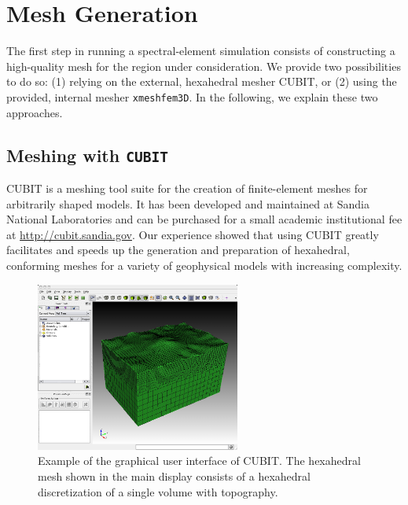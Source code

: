 \chapter{Mesh Generation}\label{cha:Mesh-Generation}

The first step in running a spectral-element simulation consists of
constructing a high-quality mesh for the region under consideration.
We provide two possibilities to do so: (1) relying on the external,
hexahedral mesher CUBIT, or (2) using the provided, internal mesher
\texttt{xmeshfem3D}. In the following, we explain these two approaches.


\section{Meshing with \texttt{CUBIT}}\label{cha:Running-the-Mesher-CUBIT}

CUBIT is a meshing tool suite for the creation of finite-element meshes
for arbitrarily shaped models. It has been developed and maintained
at Sandia National Laboratories and can be purchased for a small academic
institutional fee at \url{http://cubit.sandia.gov}. Our experience
showed that using CUBIT greatly facilitates and speeds up the generation
and preparation of hexahedral, conforming meshes for a variety of
geophysical models with increasing complexity.

\begin{figure}[htbp]
\noindent \begin{centering}
\includegraphics[width=0.6\textwidth]{figures/mount-cubit.jpg}
\par\end{centering}

\caption{Example of the graphical user interface of CUBIT. The hexahedral mesh
shown in the main display consists of a hexahedral discretization
of a single volume with topography.}


\label{fig:mount.cubit}
\end{figure}

